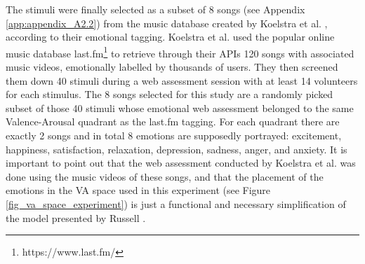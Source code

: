 The stimuli were finally selected as a subset of 8 songs (see Appendix \ref{app:appendix_A2.2}) from the music database created by Koelstra et al. \cite{koelstra_deap_2012}, according to their emotional tagging. Koelstra et al. used the popular online music database last.fm\footnote{https://www.last.fm/}  to retrieve through their APIs 120 songs with associated music videos, emotionally labelled by thousands of users. They then screened them down 40 stimuli during a web assessment session with at least 14 volunteers for each stimulus. The 8 songs selected for this study are a randomly picked subset of those 40 stimuli whose emotional web assessment belonged to the same Valence-Arousal quadrant as the last.fm tagging. For each quadrant there are exactly 2 songs and in total 8 emotions are supposedly portrayed: excitement, happiness, satisfaction, relaxation, depression, sadness, anger, and anxiety. 
It is important to point out that the web assessment conducted by Koelstra et al. was done using the music videos of these songs, and that the placement of the emotions in the \ac{VA} space used in this experiment (see Figure \ref{fig_va_space_experiment}) is just a functional and necessary simplification of the model presented by Russell \cite{russell_circumplex_1980}.

